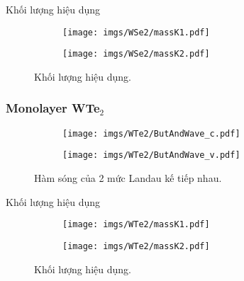 \documentclass{article}
\begin{document}
Khối lượng hiệu dụng 
\begin{figure}[htb]
	\begin{subfigure}{0.495\textwidth}
		\centering
		\texttt{[image: imgs/WSe2/massK1.pdf]}
	\end{subfigure}
	\begin{subfigure}{0.495\textwidth}
		\centering
		\texttt{[image: imgs/WSe2/massK2.pdf]}
	\end{subfigure}
	\caption{Khối lượng hiệu dụng.}
\end{figure}


\newpage
\subsubsection*{Monolayer WTe$_{2}$}
\begin{figure}[htb]
	\begin{subfigure}{0.495\textwidth}
		\centering
		\texttt{[image: imgs/WTe2/ButAndWave\_c.pdf]}
	\end{subfigure}
	\begin{subfigure}{0.495\textwidth}
		\centering
		\texttt{[image: imgs/WTe2/ButAndWave\_v.pdf]}
	\end{subfigure}
	\caption{Hàm sóng của 2 mức Landau kế tiếp nhau.}
\end{figure}

Khối lượng hiệu dụng 
\begin{figure}[htb]
	\begin{subfigure}{0.495\textwidth}
		\centering
		\texttt{[image: imgs/WTe2/massK1.pdf]}
	\end{subfigure}
	\begin{subfigure}{0.495\textwidth}
		\centering
		\texttt{[image: imgs/WTe2/massK2.pdf]}
	\end{subfigure}
	\caption{Khối lượng hiệu dụng.}
\end{figure}
\end{document}
